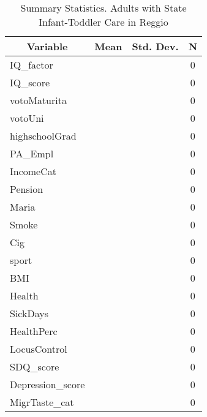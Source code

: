 
\begin{table}[htbp]\centering \caption{Summary Statistics. Adults with State Infant-Toddler Care in Reggio \label{bothAdultasiloStatReggio}}
\begin{tabular}{l c c  c}\hline\hline
\multicolumn{1}{c}{\textbf{Variable}} & \textbf{Mean}
 & \textbf{Std. Dev.} & \textbf{N}\\ \hline
IQ\_factor &  &   & 0\\
IQ\_score &  &   & 0\\
votoMaturita &  &   & 0\\
votoUni &  &   & 0\\
highschoolGrad &  &   & 0\\
PA\_Empl &  &   & 0\\
IncomeCat &  &   & 0\\
Pension &  &   & 0\\
Maria &  &   & 0\\
Smoke &  &   & 0\\
Cig &  &   & 0\\
sport &  &   & 0\\
BMI &  &   & 0\\
Health &  &   & 0\\
SickDays &  &   & 0\\
HealthPerc &  &   & 0\\
LocusControl &  &   & 0\\
SDQ\_score &  &   & 0\\
Depression\_score &  &   & 0\\
MigrTaste\_cat &  &   & 0\\
\hline\end{tabular}
\end{table}
